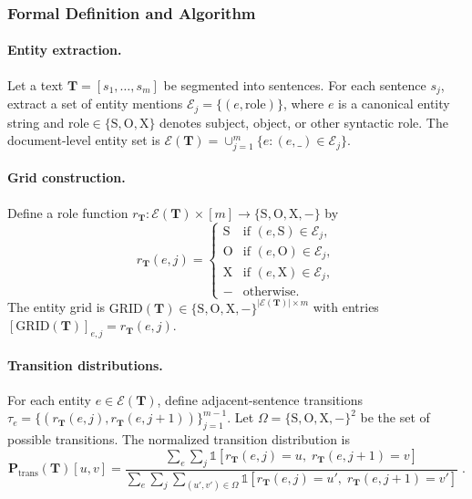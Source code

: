 \documentclass[11pt,a4paper]{article}
\begin{document}
\subsubsection{Formal Definition and Algorithm}

\paragraph{Entity extraction.} Let a text $\mathbf{T}=[s_1,\ldots,s_m]$ be segmented into sentences. For each sentence $s_j$, extract a set of entity mentions $\mathcal{E}_j=\{(e,\mathrm{role})\}$, where $e$ is a canonical entity string and $\mathrm{role}\in\{\mathrm{S},\mathrm{O},\mathrm{X}\}$ denotes subject, object, or other syntactic role. The document-level entity set is $\mathcal{E}(\mathbf{T}) = \cup_{j=1}^m \{e : (e,\_)\in \mathcal{E}_j\}$.

\paragraph{Grid construction.} Define a role function $r_\mathbf{T}: \mathcal{E}(\mathbf{T})\times [m] \to \{\mathrm{S},\mathrm{O},\mathrm{X},-\}$ by
\begin{equation}
r_\mathbf{T}(e,j) = \begin{cases}
\mathrm{S} & \text{if } (e,\mathrm{S})\in \mathcal{E}_j,\\
\mathrm{O} & \text{if } (e,\mathrm{O})\in \mathcal{E}_j,\\
\mathrm{X} & \text{if } (e,\mathrm{X})\in \mathcal{E}_j,\\
- & \text{otherwise.}
\end{cases}
\end{equation}
The entity grid is $\mathrm{GRID}(\mathbf{T}) \in \{\mathrm{S},\mathrm{O},\mathrm{X},-\}^{|\mathcal{E}(\mathbf{T})|\times m}$ with entries $[\mathrm{GRID}(\mathbf{T})]_{e,j} = r_\mathbf{T}(e,j)$.

\paragraph{Transition distributions.} For each entity $e\in\mathcal{E}(\mathbf{T})$, define adjacent-sentence transitions $\tau_e = \{(r_\mathbf{T}(e,j), r_\mathbf{T}(e,j+1))\}_{j=1}^{m-1}$. Let $\Omega=\{\mathrm{S},\mathrm{O},\mathrm{X},-\}^2$ be the set of possible transitions. The normalized transition distribution is
\begin{equation}
\mathbf{P}_{\text{trans}}(\mathbf{T})[u,v] = \frac{\sum_{e}\sum_{j}\mathbb{1}[r_\mathbf{T}(e,j)=u,\; r_\mathbf{T}(e,j+1)=v]}{\sum_{e}\sum_{j}\sum_{(u',v')\in\Omega}\mathbb{1}[r_\mathbf{T}(e,j)=u',\; r_\mathbf{T}(e,j+1)=v']}\;.
\end{equation}
\end{document}
